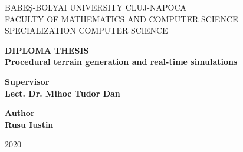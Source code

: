 \documentclass[a4paper, 12pt]{report}
\begin{document}
\begin{titlepage}

\sloppy

\begin{center}

\Large{BABEȘ-BOLYAI UNIVERSITY CLUJ-NAPOCA}\\
\vspace{0.2cm}
\Large{FACULTY OF MATHEMATICS AND COMPUTER SCIENCE}\\
\vspace{0.2cm}
\Large{SPECIALIZATION COMPUTER SCIENCE}\\

\end{center}

\vspace{2.5cm}

\begin{center}

\Huge \textbf{DIPLOMA THESIS}\\
\vspace{1 cm}
\huge \textbf{Procedural terrain generation and real-time simulations}

\end{center}

\vspace{2.5cm}

\begin{flushleft}

\Large{\textbf{Supervisor}}\\
\Large{\textbf{Lect. Dr. Mihoc Tudor Dan}}

\end{flushleft}

\vspace{0.5cm}

\begin{flushright}

\Large{\textbf{Author}}\\
\Large{\textbf{Rusu Iustin}}

\end{flushright}

\vspace{2cm}

\begin{center}

\Large{2020}

\end{center}

\end{titlepage}
\end{document}

